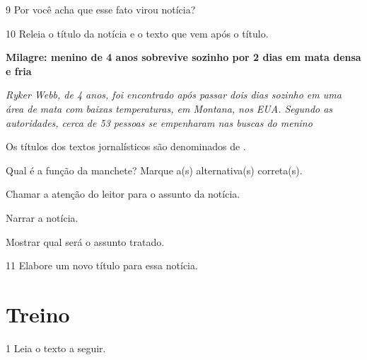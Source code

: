 \num{9} Por você acha que esse fato virou notícia?


\num{10} Releia o título da notícia e o texto que vem após o título.

\begin{myquote}
\textbf{Milagre: menino de 4 anos sobrevive sozinho por 2 dias em mata densa e fria}

\emph{Ryker Webb, de 4 anos, foi encontrado após passar dois dias
sozinho em uma área de mata com baixas temperaturas, em Montana, nos
EUA. Segundo as autoridades, cerca de 53 pessoas se empenharam nas
buscas do menino}
\end{myquote}

\begin{escolha}
\item Os títulos dos textos jornalísticos são denominados de .

\item Qual é a função da manchete? Marque a(s) alternativa(s) correta(s).

\begin{boxlist}
 Chamar a atenção do leitor para o assunto da notícia.

 Narrar a notícia.

 Mostrar qual será o assunto tratado.
\end{boxlist}
\end{escolha}

\num{11} Elabore um novo título para essa notícia.



\section*{Treino}

\num{1} Leia o texto a seguir.

